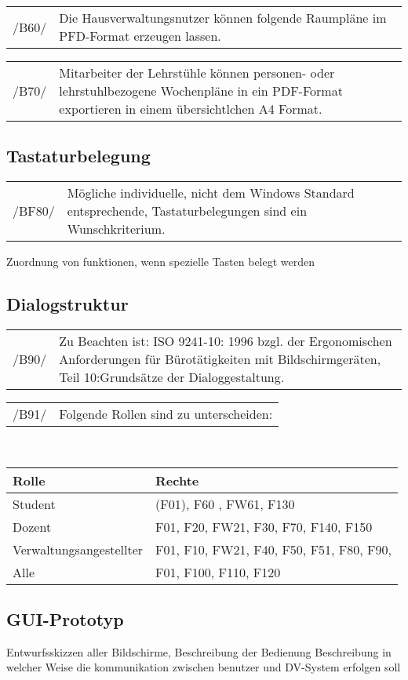 \begin{tabular}{p{1.5cm}p{14.5cm}}
 /B60/	& Die Hausverwaltungsnutzer können folgende Raumpläne im PFD-Format erzeugen lassen. \\[0.25cm]	 
\end{tabular}

\begin{tabular}{p{1.5cm}p{14.5cm}}
 /B70/	& Mitarbeiter der Lehrstühle können personen- oder lehrstuhlbezogene Wochenpläne in ein PDF-Format exportieren in einem übersichtlchen A4 Format. \\[0.25cm]	 
\end{tabular}
 
\subsection{Tastaturbelegung}

\begin{tabular}{p{1.5cm}p{14.5cm}}
 /BF80/	& Mögliche individuelle, nicht dem Windows Standard entsprechende, Tastaturbelegungen sind ein Wunschkriterium. \\[0.25cm]	 
\end{tabular}

Zuordnung von funktionen, wenn spezielle Tasten belegt werden

\subsection{Dialogstruktur}

\begin{tabular}{p{1.5cm}p{14.5cm}}
 /B90/	& Zu Beachten ist: ISO 9241-10: 1996 bzgl. der Ergonomischen Anforderungen für Bürotätigkeiten mit Bildschirmgeräten, Teil 10:Grundsätze der Dialoggestaltung. \\[0.25cm]	 
\end{tabular}

\begin{tabular}{p{1.5cm}p{14.5cm}}
 /B91/	& Folgende Rollen sind zu unterscheiden: \\[0.25cm]	 
\end{tabular}\\


\begin{table}[h]
\begin{tabular}{l|l}
Rolle&Rechte\\
\hline
\hline
Student & (F01), F60 , FW61, F130 \\
\hline
Dozent & F01, F20, FW21, F30, F70, F140, F150  \\
\hline
Verwaltungsangestellter & F01, F10, FW21, F40, F50, F51, F80, F90,  \\
\hline
Alle & F01, F100, F110, F120
\end{tabular}
\end{table}

\subsection{GUI-Prototyp}

Entwurfsskizzen aller Bildschirme, Beschreibung der Bedienung
Beschreibung in welcher Weise die kommunikation zwischen benutzer und DV-System erfolgen soll

